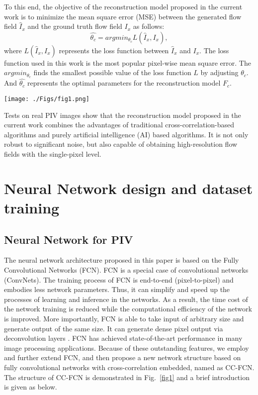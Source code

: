 \documentclass[%
 aip,
 amsmath,amssymb,
 reprint,%
]{revtex4-1}
\begin{document}
To this end, the objective of the reconstruction model proposed in the current work is to minimize the mean square error (MSE) between the generated flow field $\hat{I}_{x}$ and the ground truth flow field $I_{x}$ as follows:
\begin{equation}
\hat{\theta_{c}}=argmin_{\theta_{c}}L(\hat{I}_{x},I_{x}),
\label{eqn6}
\end{equation}
where $L(\hat{I}_{x},I_{x})$ represents the loss function between $\hat{I}_{x}$ and $I_{x}$. The loss function used in this work is the most popular pixel-wise mean square error.
The $argmin_{\theta_{c}}$ finds the smallest possible value of the loss function $L$ by adjusting $\theta_{c}$. 
And $\hat{\theta_{c}}$ represents the optimal parameters for the reconstruction model $F_{c}$.

\begin{figure*}
\centering
  \texttt{[image: ./Figs/fig1.png]}
\caption{Architecture of the CC-FCN model.}
\label{fig1}  
\end{figure*}

Tests on real PIV images show that the reconstruction model proposed in the current work combines the advantages of traditional cross-correlation-based algorithms and purely artificial intelligence (AI) based algorithms. 
It is not only robust to significant noise, but also capable of obtaining high-resolution flow fields with the single-pixel level.

\section{Neural Network design and dataset training}
\label{sect3}
\subsection{Neural Network for PIV}
\label{sect3.1}


The neural network architecture proposed in this paper is based on the Fully Convolutional Networks (FCN)\citep{long2015}.
FCN is a special case of convolutional networks (ConvNets). The training process of FCN is end-to-end (pixel-to-pixel) and embodies less network parameters. 
Thus, it can simplify and speed up the processes of learning and inference in the networks. As a result, the time cost of the network training is reduced while the computational efficiency of the network is improved.  
More importantly, FCN is able to take input of arbitrary size and generate output of the same size.
It can generate dense pixel output via deconvolution layers \citep{nie20183}. 
FCN has achieved state-of-the-art performance in many image processing applications. 
Because of these outstanding features, we employ and further extend FCN, and then propose a new network structure based on fully convolutional networks with cross-correlation embedded, named as CC-FCN.
The structure of CC-FCN is demonstrated in Fig.~\ref{fig1} and a brief introduction is given as below.
\end{document}
